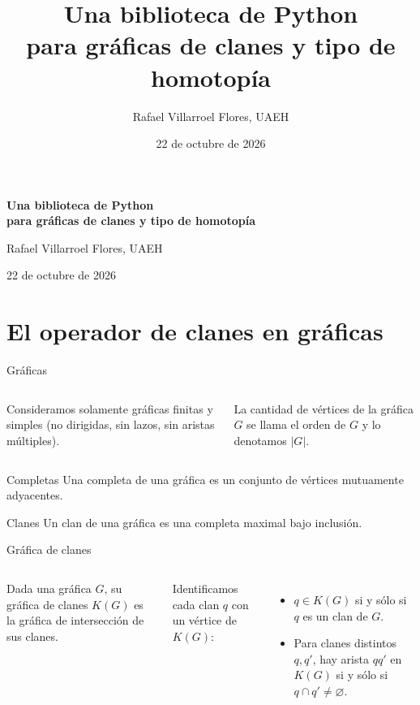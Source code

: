 \documentclass[aspectratio=169,10pt]{beamer}
\title{Una biblioteca de Python\\para gráficas de clanes y tipo de homotopía}
\author{Rafael Villarroel Flores, UAEH}
\date{22 de octubre de 2026}
\begin{document}
\begin{frame}[plain]
  \centering
  {\Large\bfseries Una biblioteca de Python\\[.45em]para gráficas de clanes y tipo de homotopía\par}
  \medskip
  {Rafael Villarroel Flores, UAEH\par}
  \smallskip
  {22 de octubre de 2026\par}
  \vspace{1em}
\end{frame}

\section{El operador de clanes en gráficas}

\begin{frame}{Gráficas}
\begin{columns}[T,onlytextwidth]
\vspace{.3em}
Consideramos solamente gráficas finitas y simples (no dirigidas, sin lazos, sin aristas múltiples).
\par\medskip
La cantidad de vértices de la gráfica $G$ se llama el \alert{orden} de $G$ y lo denotamos $|G|$.
\centering{}
\end{columns}
\end{frame}

\begin{frame}{Completas}
\centering
Una \alert{completa} de una gráfica es un conjunto de vértices mutuamente adyacentes.
\par\medskip
{}
\end{frame}

\begin{frame}{Clanes}
\centering
Un \alert{clan} de una gráfica es una completa maximal bajo inclusión.
\par\medskip
{}
\end{frame}

\begin{frame}{Gráfica de clanes}
\begin{columns}[T,onlytextwidth]
\SmallText
Dada una gráfica $G$, su \alert{gráfica de clanes $K(G)$} es la gráfica de intersección de sus clanes.
\par\medskip
Identificamos cada clan $q$ con un vértice de $K(G)$:
\begin{itemize}
\item $q\in K(G)$ si y sólo si $q$ es un clan de $G$.
\item Para clanes distintos $q,q'$, hay arista $qq'$ en $K(G)$ si y sólo si $q\cap q'\ne\varnothing$.
\end{itemize}
\centering{}
\end{columns}
\end{frame}
\end{document}
